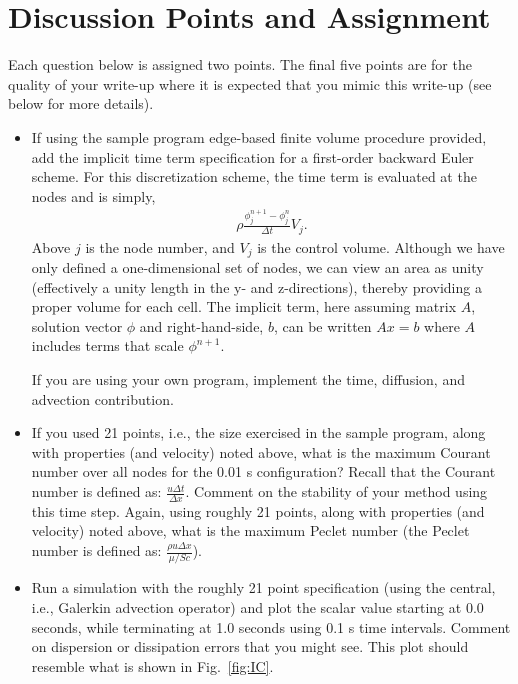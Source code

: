 \documentclass{article}
\begin{document}
\section{Discussion Points and Assignment}

Each question below is assigned two points. The final five points are for the quality of your write-up where it is expected that you mimic this write-up (see below for more details). 

\begin{itemize}

\item If using the sample program edge-based finite volume procedure provided, add the implicit time term specification
  for a first-order backward Euler scheme.
  For this discretization scheme, the time term is evaluated at the nodes and is simply,
  \begin{align}
    \rho\frac{\phi_j^{n+1} - \phi_j^n}{\Delta t} V_j.
  \end{align}
  Above $j$ is the node number, and $V_j$ is the control volume. Although we have only defined a one-dimensional
  set of nodes, we can view an area as unity (effectively a unity length in the y- and z-directions), thereby
  providing a proper volume for each cell. The implicit term, here assuming matrix $A$, solution vector $\phi$ and right-hand-side, $b$, can be written $Ax=b$ where $A$ includes terms that scale $\phi^{n+1}$. 
  
  If you are using your own program, implement the time, diffusion, and advection contribution.

\item If you used 21 points, i.e., the size exercised in the sample program, along with properties (and velocity) noted above, what is the maximum Courant number over all nodes for the 0.01 s configuration? Recall that the Courant number is defined as: $\frac{u \Delta t}{\Delta x}$. Comment on the stability of your method using this time step. Again, using roughly 21 points, along with properties (and velocity) noted above, what is the maximum Peclet number (the Peclet number is defined as: $\frac{\rho u \Delta x}{\mu/Sc}$).

\item Run a simulation with the roughly 21 point specification (using the central, i.e., Galerkin advection operator) and plot the
  scalar value starting at 0.0 seconds, while terminating at 1.0 seconds using 0.1 s time intervals. Comment on dispersion or
  dissipation errors that you might see. This plot should resemble what is shown in Fig.~\ref{fig:IC}.
  

\end{itemize}
\end{document}
